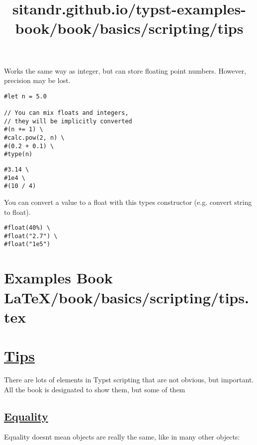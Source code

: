 Works the same way as integer, but can store floating point numbers.
However, precision may be lost.

\begin{verbatim}
#let n = 5.0

// You can mix floats and integers, 
// they will be implicitly converted
#(n += 1) \
#calc.pow(2, n) \
#(0.2 + 0.1) \
#type(n) 
\end{verbatim}

\pandocbounded{}

\begin{verbatim}
#3.14 \
#1e4 \
#(10 / 4)
\end{verbatim}

\pandocbounded{}

You can convert a value to a float with this type\textquotesingle s
constructor (e.g. convert string to float).

\begin{verbatim}
#float(40%) \
#float("2.7") \
#float("1e5")
\end{verbatim}

\pandocbounded{}


\section{Examples Book LaTeX/book/basics/scripting/tips.tex}
\title{sitandr.github.io/typst-examples-book/book/basics/scripting/tips}

\section{\texorpdfstring{\hyperref[tips]{Tips}}{Tips}}\label{tips}

There are lots of elements in Typst scripting that are not obvious, but
important. All the book is designated to show them, but some of them

\subsection{\texorpdfstring{\hyperref[equality]{Equality}}{Equality}}\label{equality}

Equality doesn\textquotesingle t mean objects are really the same, like
in many other objects:

